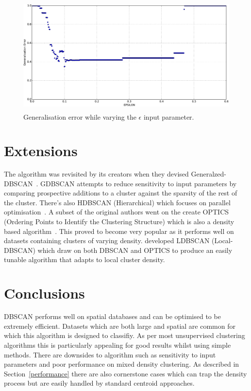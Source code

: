 \documentclass{ecsarticle}     %
\begin{document}
\begin{figure}[ht]
   \centering
    \includegraphics[height = 6cm]{error.pdf}
   \caption{Generalisation error while varying the $\epsilon$ input parameter.}
   \label{fig:error}
\end{figure}




\section{Extensions}

The algorithm was revisited by its creators when they devised Generalzed-DBSCAN~\citep{ester98gdbscan}.
GDBSCAN attempts to reduce sensitivity to input parameters by comparing prospective additions to a cluster against the sparsity of the rest of the cluster. 
There's also HDBSCAN (Hierarchical) which focuses on parallel optimisation~\citep{li11}.
A subset of the original authors went on the create OPTICS (Ordering Points to Identify the Clustering Structure) which is also a density based algorithm~\citep{Ankerst99optics}.
This proved to become very popular as it performs well on datasets containing clusters of varying density.    
\cite{lian07ldbscan} developed LDBSCAN (Local-DBSCAN) which draw on both DBSCAN and OPTICS to produce an easily tunable algorithm that adapts to local cluster density.


\section{Conclusions}
DBSCAN performs well on spatial databases and can be optimised to be extremely efficient.
Datasets which are both large and spatial are common for which this algorithm is designed to classifiy.
As per most unsupervised clustering algorithms this is particularly appealing for good results whilst using simple methods. 
There are downsides to algorithm such as sensitivity to input parameters and poor performance on mixed density clustering.
As described in Section~\ref{performance} there are also cornerstone cases which can trap the density process but are easily handled by standard centroid approaches.
\end{document}
